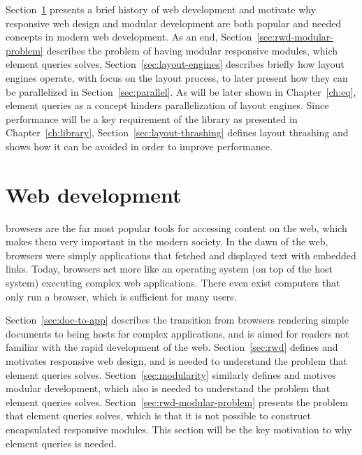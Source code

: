 \documentclass[a4paper,11pt]{kth-mag}
\begin{document}
    Section~\ref{sec:web-dev} presents a brief history of \gls{web} development and motivate why \gls{responsive} \gls{web} design and modular development are both popular and needed concepts in modern \gls{web} development.
    As an end, Section~\ref{sec:rwd-modular-problem} describes the problem of having modular \gls{responsive} modules, which element queries solves.    
    Section~\ref{sec:layout-engines} describes briefly how \glspl{layout engine} operate, with focus on the layout process, to later present how they can be parallelized in Section~\ref{sec:parallel}.
    As will be later shown in Chapter~\ref{ch:eq}, element queries as a concept hinders parallelization of \glspl{layout engine}.
    Since performance will be a key requirement of the library as presented in Chapter~\ref{ch:library}, Section~\ref{sec:layout-thrashing} defines \gls{layout thrashing} and shows how it can be avoided in order to improve performance.

    \section{Web development}\label{sec:web-dev}
      \Glspl{browser} are the far most popular tools for accessing content on the \gls{web}, which makes them very important in the modern society.
      In the dawn of the \gls{web}, \glspl{browser} were simply applications that fetched and displayed text with embedded links.
      Today, \glspl{browser} act more like an operating system (on top of the host system) executing complex \gls{web} applications.
      There even exist computers that only run a \gls{browser}, which is sufficient for many users.
      
      Section~\ref{sec:doc-to-app} describes the transition from \glspl{browser} rendering simple \glspl{document} to being hosts for complex applications, and is aimed for readers not familiar with the rapid development of the \gls{web}.
      Section~\ref{sec:rwd} defines and motivates \gls{responsive} \gls{web} design, and is needed to understand the problem that element queries solves.
      Section~\ref{sec:modularity} similarly defines and motives modular development, which also is needed to understand the problem that element queries solves.
      Section~\ref{sec:rwd-modular-problem} presents the problem that element queries solves, which is that it is not possible to construct \gls{encapsulated} \gls{responsive} modules.
      This section will be the key motivation to why element queries is needed.
\end{document}
